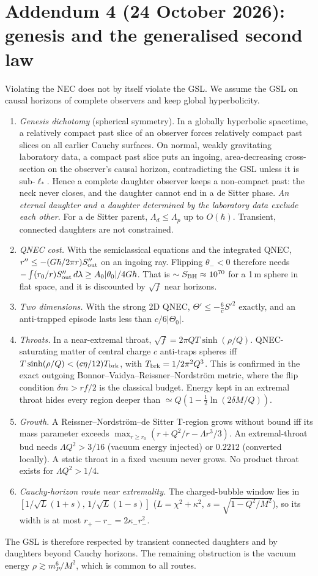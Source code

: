 \documentclass[11pt,a4paper]{article}
\theoremstyle{remark}\newtheorem{remark}[theorem]{Remark}
\begin{document}
\section*{Addendum 4 (24 October 2026): genesis and the generalised second law}
Violating the NEC does not by itself violate the GSL. We assume the GSL on causal horizons of complete observers and keep global hyperbolicity.
\begin{enumerate}
\item \emph{Genesis dichotomy} (spherical symmetry). In a globally hyperbolic spacetime, a relatively compact past slice of an observer forces relatively compact
past slices on all earlier Cauchy surfaces. On normal, weakly gravitating laboratory data, a compact past slice puts an ingoing, area-decreasing cross-section on
the observer's causal horizon, contradicting the GSL unless it is sub-$\ell_*$. Hence a complete daughter observer keeps a non-compact past: the neck never
closes, and the daughter cannot end in a de Sitter phase. \emph{An eternal daughter and a daughter determined by the laboratory data exclude each other.} For a
de Sitter parent, $\Lambda_d\le\Lambda_p$ up to $O(\hbar)$. Transient, connected daughters are not constrained.
\item \emph{QNEC cost.} With the semiclassical equations and the integrated QNEC, $r''\le-(G\hbar/2\pi r)S''_{\rm out}$ on an ingoing ray. Flipping $\theta_-<0$
therefore needs $-\int(r_0/r)S''_{\rm out}\,d\lambda\ge A_0|\theta_0|/4G\hbar$. That is $\sim S_{\rm BH}\approx10^{70}$ for a 1\,m sphere in flat space, and it is
discounted by $\sqrt f$ near horizons.
\item \emph{Two dimensions.} With the strong 2D QNEC, $\Theta'\le-\frac6cS'^2$ exactly, and an anti-trapped episode lasts less than $c/6|\Theta_0|$.
\item \emph{Throats.} In a near-extremal throat, $\sqrt f=2\pi QT\sinh(\rho/Q)$. QNEC-saturating matter of central charge $c$ anti-traps spheres iff
$T\sinh(\rho/Q)<(c\eta/12)T_{\rm brk}$, with $T_{\rm brk}=1/2\pi^2Q^3$. This is confirmed in the exact outgoing Bonnor--Vaidya--Reissner--Nordstr\"om metric,
where the flip condition $\delta m>rf/2$ is the classical budget. Energy kept in an extremal throat hides every region deeper than
$\simeq Q(1-\tfrac12\ln(2\delta M/Q))$.
\item \emph{Growth.} A Reissner--Nordstr\"om--de Sitter T-region grows without bound iff its mass parameter exceeds
$\max_{r\ge r_0}(r+Q^2/r-\Lambda r^3/3)$. An extremal-throat bud needs $\Lambda Q^2>3/16$ (vacuum energy injected) or $0.2212$ (converted locally). A static throat
in a fixed vacuum never grows. No product throat exists for $\Lambda Q^2>1/4$.
\item \emph{Cauchy-horizon route near extremality.} The charged-bubble window lies in $[1/\sqrt{L}(1+s),\,1/\sqrt{L}(1-s)]$ ($L=\chi^2+\kappa^2$,
$s=\sqrt{1-Q^2/M^2}$), so its width is at most $r_+-r_-=2\kappa_-r_-^2$.
\end{enumerate}
The GSL is therefore respected by transient connected daughters and by daughters beyond Cauchy horizons. The remaining obstruction is the vacuum energy
$\rho\gtrsim m_P^6/M^2$, which is common to all routes.
\end{document}

